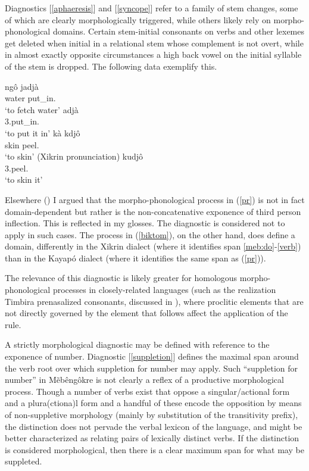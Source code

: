 \documentclass[output=paper]{langscibook}
\begin{document}
Diagnostics [\ref{aphaeresis}] and [\ref{syncope}] refer to a family of stem changes, some of which are clearly morphologically triggered, while others likely rely on morpho-phonolog\-i\-cal domains. Certain stem-initial consonants on verbs and other lexemes get deleted when initial in a relational stem whose complement is not overt, while in almost exactly opposite circumstances a high back vowel on the initial syllable of the stem is dropped. The following data exemplify this.

\ea\label{pr}\ea\gll ngô jadjà\\
      water put\_in.\Fin{}\\
    \glt `to fetch water'
  \ex\gll adjà\\
      3.put\_in.\Fin{}\\
    \glt `to put it in'
  \z
\ex\label{biktom}\ea\gll kà kdjô\\
      skin peel.\Fin{}\\
   \glt `to skin' (Xikrin pronunciation)
  \ex\gll kudjô\\
      3.peel.\Fin{}\\
    \glt `to skin it'
  \z
\z

Elsewhere (\citealt{salanova:liames11}) I argued that the  morpho-phonological process in (\ref{pr}) is not in fact domain-dependent but rather is the non-concate\-na\-tive exponence of third person inflection. This is reflected in my glosses. The diagnostic is considered not to apply in such cases. The process in (\ref{biktom}), on the other hand, does define a domain, differently in the Xikrin dialect (where it identifies span \ref{meb:do}-\ref{verb}) than in the Kayapó dialect (where it identifies the same span as (\ref{pr})).

The relevance of this diagnostic is likely greater for homologous morpho-phonological processes in closely-related languages (such as the realization Timbira prenasalized consonants, discussed in \citealt{salanova:liames11}), where proclitic elements that are not directly governed by the element that follows affect the application of the rule.


A strictly morphological diagnostic may be defined with reference to the exponence of number. Diagnostic [\ref{suppletion}] defines the maximal span around the verb root over which suppletion for number may apply. Such “suppletion for number” in Mẽbêngôkre is not clearly a reflex of a productive morphological process. Though a number of verbs exist that oppose a singul{ar/actional} form and a plura(ctiona)l form and a handful of these encode the opposition by means of non-suppletive morphology (mainly by substitution of the transitivity prefix), the distinction does not pervade the verbal lexicon of the language, and might be better characterized as relating pairs of lexically distinct verbs. If the distinction is considered morphological, then there is a clear maximum span for what may be suppleted.
\end{document}

